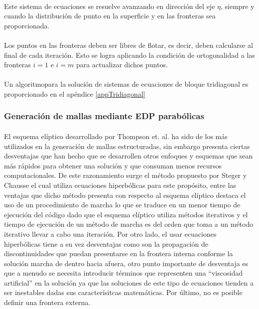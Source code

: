 \documentclass[letterpaper, openright, 12pt]{book}
\begin{document}
    \paragraph*{}
        Este sistema de ecuaciones se resuelve avanzando en dirección del eje
        $\eta$, siempre y cuando la distribución de punto en la superficie y en
        las fronteras sea proporcionada.
    \paragraph*{}
        Los puntos en las fronteras deben ser libres de flotar, es decir, deben
        calcularse al final de cada iteración. Esto se logra aplicando la
        condición de ortogonalidad a las fronteras $i = 1$ e $i = m$ para
        actualizar dichos puntos.
    \paragraph*{}
        Un algoritmopara la solución de sistemas de ecuaciones de bloque
        tridiagonal es proporcionado en el apéndice \ref{appTridiagonal}
    \subsubsection{Generación de mallas mediante EDP parabólicas}
    \paragraph*{}
        El esquema elíptico desarrollado por Thompson et. al.
        \cite{thompson1974automatic} ha sido de los más utilizados en la
        generación de mallas estructuradas, sin embargo presenta ciertas
        desventajas que han hecho que se desarrollen otros enfoques y esquemas
        que sean más rápidos para obtener una solución y que consuman menos
        recursos computacionales. De este razonamiento surge el método propuesto
        por Steger y Chausse \cite{Hyperbolic-steger1980generation} el cual
        utiliza ecuaciones hiperbólicas para este propósito, entre las ventajas
        que dicho método presenta con respecto al esquema elíptico destaca el
        uso de un procedimiento de marcha lo que se traduce en un menor tiempo
        de ejecución del código dado que el esquema elíptico utiliza métodos
        iterativos y el tiempo de ejecución de un método de marcha es del orden
        que toma a un método iterativo llevar a cabo una iteración. Por otro
        lado, el usar ecuaciones hiperbólicas tiene a su vez desventajas como
        son la propagación de discontinuidades que puedan presentarse en la
        frontera interna conforme la solución marcha de dentro hacia afuera,
        otro punto importante de desventaja es que a menudo se necesita
        introducir términos que representen una ``viscosidad artificial'' en la
        solución ya que las soluciones de este tipo de ecuaciones tienden a ser
        inestables dadas sus caracterísitcas matemáticas. Por último, no es
        posible definir una frontera externa.
\end{document}
